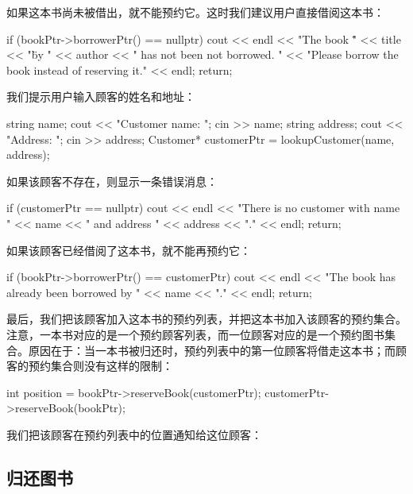 如果这本书尚未被借出，就不能预约它。这时我们建议用户直接借阅这本书：

\begin{codebox}
  if (bookPtr->borrowerPtr() == nullptr) {
    cout << endl << "The book \"" << title << "\" by "
         << author << " has not been not borrowed. "
         << "Please borrow the book instead of reserving it."
         << endl;
    return;
  }
\end{codebox}

我们提示用户输入顾客的姓名和地址：

\begin{codebox}
  string name;
  cout << "Customer name: ";
  cin >> name;
  string address;
  cout << "Address: ";
  cin >> address;
  Customer* customerPtr = lookupCustomer(name, address);
\end{codebox}

如果该顾客不存在，则显示一条错误消息：

\begin{codebox}
  if (customerPtr == nullptr) {
    cout << endl << "There is no customer with name "
         << name << " and address " << address << "." << endl;
    return;
  }
\end{codebox}

如果该顾客已经借阅了这本书，就不能再预约它：

\begin{codebox}
  if (bookPtr->borrowerPtr() == customerPtr) {
    cout << endl << "The book has already been borrowed by "
         << name << "." << endl;
    return;
  }
\end{codebox}

最后，我们把该顾客加入这本书的预约列表，并把这本书加入该顾客的预约集合。注意，一本书对应的是一个预约顾客列表，而一位顾客对应的是一个预约图书集合。原因在于：当一本书被归还时，预约列表中的第一位顾客将借走这本书；而顾客的预约集合则没有这样的限制：

\begin{codebox}
  int position = bookPtr->reserveBook(customerPtr);
  customerPtr->reserveBook(bookPtr);
\end{codebox}

我们把该顾客在预约列表中的位置通知给这位顾客：

\begin{codebox}
  cout << endl << position << "nd reserve." << endl;
}
\end{codebox}

\subsection{归还图书}

